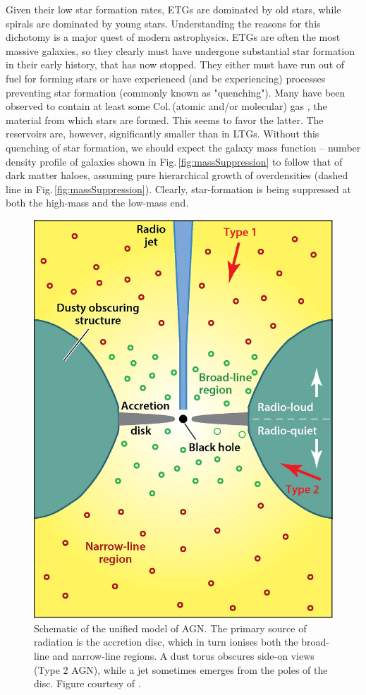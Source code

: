 	Given their low star formation rates, ETGs are dominated by old stars, while spirals are dominated by young stars. Understanding the reasons for this dichotomy is a major quest of modern astrophysics. ETGs are often the most massive galaxies, so they clearly must have undergone substantial star formation in their early history, that has now stopped. They either must have run out of fuel for forming stars or have experienced (and be experiencing) processes preventing star formation (commonly known as "quenching"). Many have been observed to contain at least some Col.\,(atomic and/or molecular) gas \citep[e.g.][]{Lees1991}, the material from which stars are formed. This seems to favor the latter. The reservoirs are, however, significantly smaller than in LTGs. Without this quenching of star formation, we should expect the galaxy mass function -- number density profile of galaxies shown in Fig.\,\ref{fig:massSuppression} to follow that of dark matter haloes, assuming pure hierarchical growth of overdensities (dashed line in Fig.\,\ref{fig:massSuppression}). Clearly, star-formation is being suppressed at both the high-mass and the low-mass end.

	\begin{figure}
		\centering
		\includegraphics[width=.5\textwidth]{introduction/unifiedAGN.jpeg}
		\caption[Schematic of unified model of AGN]{Schematic of the unified model of AGN. The primary source of radiation is the accretion disc, which in turn ionises both the broad-line and narrow-line regions. A dust torus obscures side-on views (Type 2 AGN), while a jet sometimes emerges from the poles of the disc. Figure courtesy of \citet{Heckman2014}.}
		\label{fig:UnifiedAGN}
	\end{figure}

